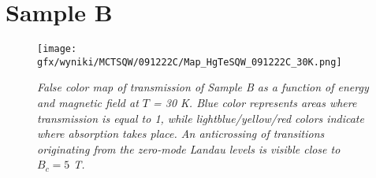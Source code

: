 \documentclass[titlepage,a4paper]{book}
\begin{document}
\section{Sample B}
\begin{figure}[ht]
	\centering
	\texttt{[image: gfx/wyniki/MCTSQW/091222C/Map\_HgTeSQW\_091222C\_30K.png]}
	\vspace{-10pt}
	\caption{\textit{False color map of transmission of Sample B as a function of energy and magnetic field at $T$ = 30 K. Blue color represents areas where transmission is equal to 1, while lightblue/yellow/red colors indicate where absorption takes place. An anticrossing of transitions originating from the zero-mode Landau levels is visible close to $B_c = 5$ T. }}
	\label{fig:Map_SQW_30K}
\end{figure}
\end{document}
